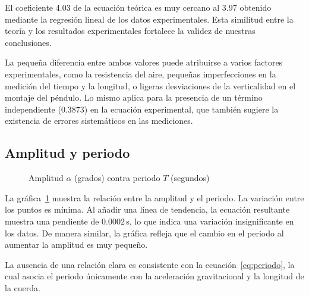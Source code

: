 \documentclass[twocolumn]{article}
\numberwithin{table}{section}
\begin{document}
El coeficiente 4.03 de la ecuación teórica es muy cercano al 3.97 obtenido
mediante la regresión lineal de los datos experimentales. Esta similitud
entre la teoría y los resultados experimentales fortalece la validez de
nuestras conclusiones.

La pequeña diferencia entre ambos valores puede atribuirse a varios factores
experimentales, como la resistencia del aire, pequeñas imperfecciones en la
medición del tiempo y la longitud, o ligeras desviaciones de la verticalidad en
el montaje del péndulo. Lo mismo aplica para la presencia de un término
independiente (0.3873) en la ecuación experimental, que también sugiere la
existencia de errores sistemáticos en las mediciones.

\subsection{Amplitud y periodo}

\begin{figure}[ht]
  \centering
  \caption{Amplitud $\alpha$ (grados) contra periodo $T$
  (segundos)}\label{fig:amplitud_periodo}
\end{figure}

La gráfica~\ref{fig:amplitud_periodo} muestra la relación entre la
amplitud y el periodo. La variación entre los puntos es mínima. Al
añadir una línea de tendencia, la ecuación resultante muestra una
pendiente de $0.0002$\,s, lo que indica una variación insignificante
en los datos. De manera similar, la gráfica refleja que el cambio en
el periodo al aumentar la amplitud es muy pequeño.

La ausencia de una relación clara es consistente con la
ecuación~\eqref{eq:periodo}, la cual asocia el periodo únicamente con la
aceleración gravitacional y la longitud de la cuerda.
\end{document}
